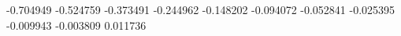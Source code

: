 -0.704949
-0.524759
-0.373491
-0.244962
-0.148202
-0.094072
-0.052841
-0.025395
-0.009943
-0.003809
0.011736

